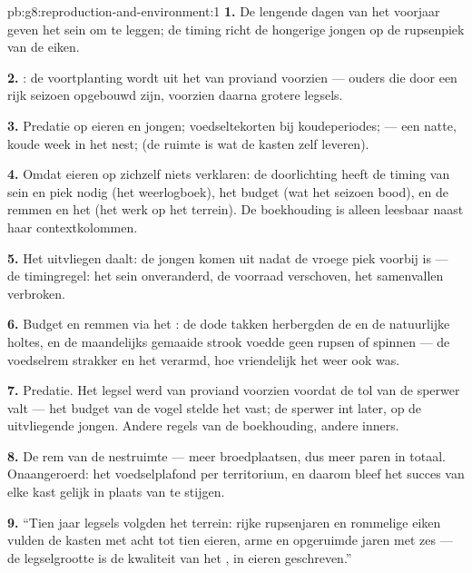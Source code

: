 \begin{solution}{pb:g8:reproduction-and-environment:1}
\textbf{1.} De lengende dagen van het voorjaar geven het sein om te
leggen; de timing richt de hongerige jongen op de rupsenpiek van de eiken.

\textbf{2.} : de
voortplanting wordt uit het  van proviand voorzien --- ouders
die door een rijk seizoen opgebouwd zijn, voorzien daarna grotere legsels.

\textbf{3.} Predatie op eieren en jongen; voedseltekorten bij koudeperiodes;
 --- een natte, koude week in het nest; (de ruimte is wat de
kasten zelf leveren).

\textbf{4.} Omdat eieren op zichzelf niets verklaren: de doorlichting heeft
de timing van sein en piek nodig (het weerlogboek), het budget (wat het
seizoen bood), en de remmen en het  (het werk op het terrein). De
boekhouding is alleen leesbaar naast haar contextkolommen.

\textbf{5.} Het uitvliegen daalt: de jongen komen uit nadat de vroege piek
voorbij is --- de timingregel: het sein onveranderd, de voorraad verschoven,
het samenvallen verbroken.

\textbf{6.} Budget en remmen via het : de dode takken herbergden
de  en de natuurlijke holtes, en de maandelijks gemaaide strook
voedde geen rupsen of spinnen --- de voedselrem strakker en het 
verarmd, hoe vriendelijk het weer ook was.

\textbf{7.} Predatie. Het legsel werd van proviand voorzien voordat de tol
van de sperwer valt --- het budget van de vogel stelde het vast; de sperwer
int later, op de uitvliegende jongen. Andere regels van de boekhouding,
andere inners.

\textbf{8.} De rem van de nestruimte --- meer broedplaatsen, dus meer
paren in totaal. Onaangeroerd: het voedselplafond per territorium, en
daarom bleef het succes van elke kast gelijk in plaats van te stijgen.

\textbf{9.} ``Tien jaar legsels volgden het terrein: rijke rupsenjaren en
rommelige eiken vulden de kasten met acht tot tien eieren, arme en
opgeruimde jaren met zes --- de legselgrootte is de kwaliteit van het
, in eieren geschreven.''


\end{solution}
